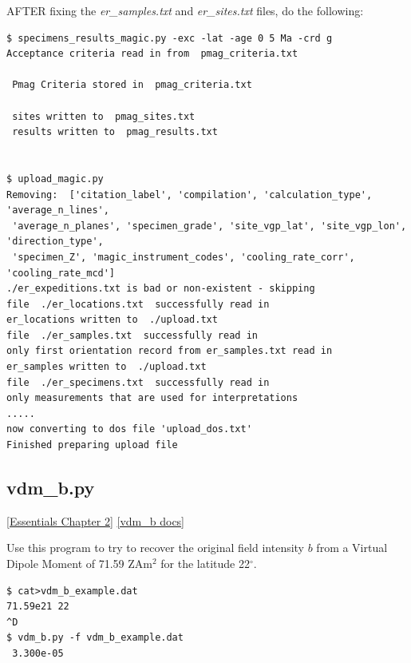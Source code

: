 \documentclass[11pt]{book}
\begin{document}
{{{AFTER fixing the {\it er\_samples.txt} and {\it er\_sites.txt} files, do the following:



\begin{verbatim}
$ specimens_results_magic.py -exc -lat -age 0 5 Ma -crd g
Acceptance criteria read in from  pmag_criteria.txt

 Pmag Criteria stored in  pmag_criteria.txt

 sites written to  pmag_sites.txt
 results written to  pmag_results.txt


$ upload_magic.py
Removing:  ['citation_label', 'compilation', 'calculation_type', 'average_n_lines',
 'average_n_planes', 'specimen_grade', 'site_vgp_lat', 'site_vgp_lon', 'direction_type',
 'specimen_Z', 'magic_instrument_codes', 'cooling_rate_corr', 'cooling_rate_mcd']
./er_expeditions.txt is bad or non-existent - skipping
file  ./er_locations.txt  successfully read in
er_locations written to  ./upload.txt
file  ./er_samples.txt  successfully read in
only first orientation record from er_samples.txt read in
er_samples written to  ./upload.txt
file  ./er_specimens.txt  successfully read in
only measurements that are used for interpretations
.....
now converting to dos file 'upload_dos.txt'
Finished preparing upload file
\end{verbatim}




%

\subsection{vdm\_b.py}
\href{http://earthref.org/MAGIC/books/Tauxe/Essentials/WebBook3ch2.html#ch2}{[Essentials Chapter 2]}
\href{https://github.com/PmagPy/PmagPy/blob/master/programs/vdm_b.py}{[vdm\_b docs]}


Use this program to try to recover the original field intensity $b$ from a Virtual Dipole Moment of  71.59 ZAm$^2$ for the latitude 22$^{\circ}$.

\begin{verbatim}
$ cat>vdm_b_example.dat
71.59e21 22
^D
$ vdm_b.py -f vdm_b_example.dat
 3.300e-05
\end{verbatim}

}}}
\end{document}
